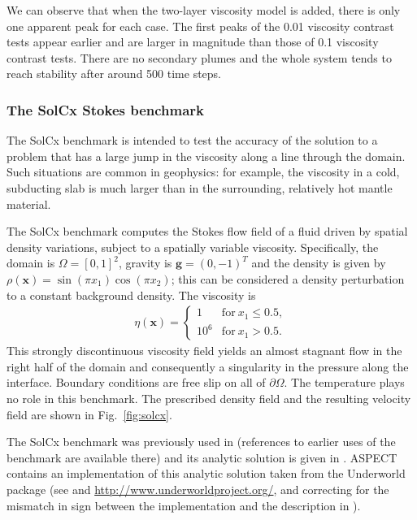 \documentclass{article}
\newcommand{\aspect}{\textsc{ASPECT}}
\begin{document}
We can observe that when the two-layer viscosity model is added, there is only one apparent peak for each case. The first peaks of the 0.01 viscosity contrast tests appear earlier and are larger in magnitude than those of 0.1 viscosity contrast tests.  There are no secondary plumes and the whole system tends to reach stability after around 500 time steps.

\subsubsection{The SolCx Stokes benchmark}
\label{sec:benchmark-solcx}

The SolCx benchmark is intended to test the accuracy of the solution to a
problem that has a large jump in the viscosity along a line through the
domain. Such situations are common in geophysics: for example, the viscosity
in a cold, subducting slab is much larger than in the surrounding, relatively
hot mantle material.

The SolCx benchmark computes the Stokes flow field of a fluid driven by
spatial density variations, subject to a spatially variable
viscosity. Specifically, the domain is $\Omega=[0,1]^2$, gravity is $\mathbf
g=(0,-1)^T$ and the density is given
by $\rho(\mathbf x)=\sin(\pi x_1)\cos(\pi x_2)$; this can be considered a
density perturbation to a constant background density. The viscosity is
\begin{align*}
  \eta(\mathbf x) = \left\{
    \begin{matrix}
      1 & \text{for}\ x_1 \le 0.5, \\
      10^6 & \text{for}\ x_1  > 0.5.
    \end{matrix}
  \right.
\end{align*}
This strongly discontinuous viscosity field yields an almost stagnant flow in
the right half of the domain and consequently a singularity in the pressure
along the interface.
Boundary conditions are free slip on all of $\partial\Omega$. The temperature
plays no role in this benchmark. The prescribed density field and the
resulting velocity field are shown in Fig.~\ref{fig:solcx}.

The SolCx benchmark was previously used in \cite[Section 4.1.1]{DMGT11}
(references to earlier uses of the benchmark are available there) and its analytic
solution is given in \cite{Zho96}. \aspect{} contains an implementation of
this analytic solution taken from the Underworld package (see \cite{MQLMAM07}
and \url{http://www.underworldproject.org/}, and correcting for the mismatch
in sign between the implementation and the description in \cite{DMGT11}).
\end{document}
